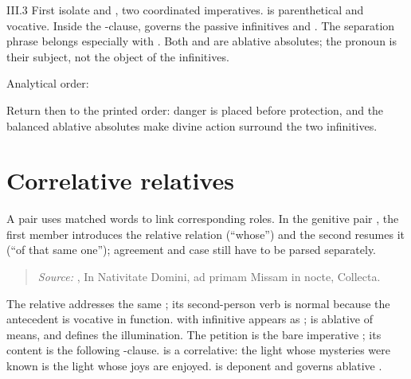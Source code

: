 \begin{courseunit}{III.3}
First isolate  and , two coordinated imperatives.
 is parenthetical and  vocative. Inside the
-clause,  governs the passive infinitives
 and . The separation phrase
 belongs especially with .
Both  and  are ablative absolutes; the
pronoun is their subject, not the object of the infinitives.

Analytical order:
\begin{quote}
\end{quote}
Return then to the printed order: danger is placed before protection, and the
balanced ablative absolutes make divine action surround the two infinitives.

\section{Correlative relatives}

A  pair uses matched words to link corresponding roles. In
the genitive pair , the first member introduces the
relative relation (``whose'') and the second resumes it (``of that same
one''); agreement and case still have to be parsed separately.

\begin{quote}

\emph{Source:} \Missal, In Nativitate Domini, ad primam Missam in nocte,
Collecta.
\end{quote}

The relative  addresses the same ; its second-person
verb  is normal because the antecedent is vocative in function.
 with infinitive appears as ;
 is ablative of means, and  defines
the illumination. The petition is the bare imperative ; its content
is the following -clause.  is a correlative:
the light whose mysteries were known is the light whose joys are enjoyed.
 is deponent and governs ablative .


\end{courseunit}
